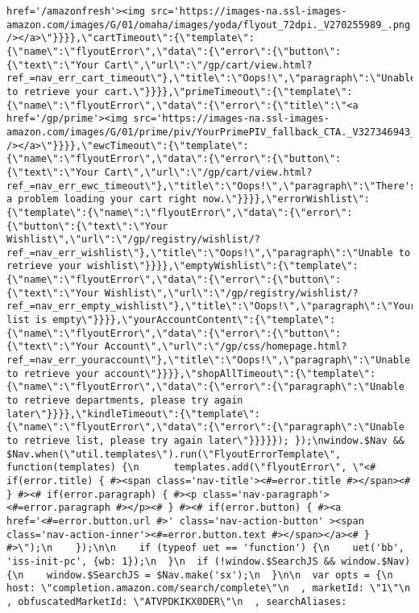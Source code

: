 \documentclass[
]{article}
\begin{document}
\begin{verbatim}
href='/amazonfresh'><img src='https://images-na.ssl-images-amazon.com/images/G/01/omaha/images/yoda/flyout_72dpi._V270255989_.png' /></a>\"}}}},\"cartTimeout\":{\"template\":{\"name\":\"flyoutError\",\"data\":{\"error\":{\"button\":{\"text\":\"Your Cart\",\"url\":\"/gp/cart/view.html?ref_=nav_err_cart_timeout\"},\"title\":\"Oops!\",\"paragraph\":\"Unable to retrieve your cart.\"}}}},\"primeTimeout\":{\"template\":{\"name\":\"flyoutError\",\"data\":{\"error\":{\"title\":\"<a href='/gp/prime'><img src='https://images-na.ssl-images-amazon.com/images/G/01/prime/piv/YourPrimePIV_fallback_CTA._V327346943_.jpg' /></a>\"}}}},\"ewcTimeout\":{\"template\":{\"name\":\"flyoutError\",\"data\":{\"error\":{\"button\":{\"text\":\"Your Cart\",\"url\":\"/gp/cart/view.html?ref_=nav_err_ewc_timeout\"},\"title\":\"Oops!\",\"paragraph\":\"There's a problem loading your cart right now.\"}}}},\"errorWishlist\":{\"template\":{\"name\":\"flyoutError\",\"data\":{\"error\":{\"button\":{\"text\":\"Your Wishlist\",\"url\":\"/gp/registry/wishlist/?ref_=nav_err_wishlist\"},\"title\":\"Oops!\",\"paragraph\":\"Unable to retrieve your wishlist\"}}}},\"emptyWishlist\":{\"template\":{\"name\":\"flyoutError\",\"data\":{\"error\":{\"button\":{\"text\":\"Your Wishlist\",\"url\":\"/gp/registry/wishlist/?ref_=nav_err_empty_wishlist\"},\"title\":\"Oops!\",\"paragraph\":\"Your list is empty\"}}}},\"yourAccountContent\":{\"template\":{\"name\":\"flyoutError\",\"data\":{\"error\":{\"button\":{\"text\":\"Your Account\",\"url\":\"/gp/css/homepage.html?ref_=nav_err_youraccount\"},\"title\":\"Oops!\",\"paragraph\":\"Unable to retrieve your account\"}}}},\"shopAllTimeout\":{\"template\":{\"name\":\"flyoutError\",\"data\":{\"error\":{\"paragraph\":\"Unable to retrieve departments, please try again later\"}}}},\"kindleTimeout\":{\"template\":{\"name\":\"flyoutError\",\"data\":{\"error\":{\"paragraph\":\"Unable to retrieve list, please try again later\"}}}}}); });\nwindow.$Nav && $Nav.when(\"util.templates\").run(\"FlyoutErrorTemplate\", function(templates) {\n      templates.add(\"flyoutError\", \"<# if(error.title) { #><span class='nav-title'><#=error.title #></span><# } #><# if(error.paragraph) { #><p class='nav-paragraph'><#=error.paragraph #></p><# } #><# if(error.button) { #><a href='<#=error.button.url #>' class='nav-action-button' ><span class='nav-action-inner'><#=error.button.text #></span></a><# } #>\");\n    });\n\n    if (typeof uet == 'function') {\n    uet('bb', 'iss-init-pc', {wb: 1});\n  }\n  if (!window.$SearchJS && window.$Nav) {\n    window.$SearchJS = $Nav.make('sx');\n  }\n\n  var opts = {\n    host: \"completion.amazon.com/search/complete\"\n  , marketId: \"1\"\n  , obfuscatedMarketId: \"ATVPDKIKX0DER\"\n  , searchAliases: 
\end{verbatim}
\end{document}
